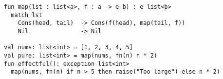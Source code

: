 \begin{algorithm}

\begin{verbatim}
fun map(lst : list<a>, f : a -> e b) : e list<b>
  match lst
    Cons(head, tail)  -> Cons(f(head), map(tail, f))
    Nil               -> Nil

val nums: list<int> = [1, 2, 3, 4, 5]
val pure: list<int> = map(nums, fn(n) n * 2)
fun effectful(): exception list<int>
  map(nums, fn(n) if n > 5 then raise("Too large") else n * 2)
\end{verbatim}

\caption{Effect polymorphism in Koka %
\label{alg-eff:polymorphism-koka}}
\end{algorithm}